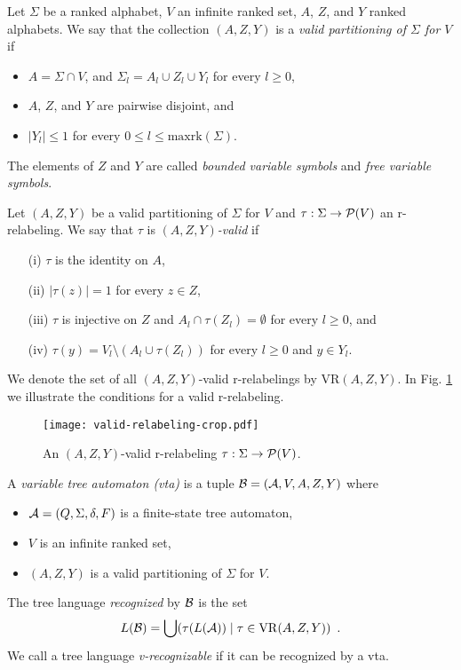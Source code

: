 \documentclass[10pt]{scrartcl}
\newcommand{\maxrk}{{\mathrm{maxrk}}}
\newcommand{\VR}{\mathrm{VR}}
\begin{document}
Let $\Sigma$ be a ranked alphabet, $V$ an infinite ranked set,  $A$, $Z$, and $Y$ 
ranked alphabets. We say that the collection $(A,Z,Y)$ is a {\em valid partitioning
  of $\Sigma$ for $V$} if 
\begin{itemize}
\item $A=\Sigma  \cap V$, and $\Sigma_l = A_l \cup Z_l \cup Y_l$ for every $l\geq 0$, 
\item $A$, $Z$, and $Y$ are pairwise disjoint, and 
\item $|Y_l| \le 1$ for every $0 \le l \le \maxrk(\Sigma)$.
\end{itemize}
The elements of $Z$ and $Y$ are called {\em bounded variable symbols} and {\em
  free variable symbols}. 

Let $(A,Z,Y)$ be a valid partitioning
  of $\Sigma$ for $V$ and $\tau: \Sigma \rightarrow {\cal P}(V)$ an
  r-relabeling. We say that $\tau$ is {\em $(A,Z,Y)$-valid} if 
\begin{enumerate}
\item[(i)] $\tau$ is the identity on $A$,
\item[(ii)] $|\tau(z)| = 1$ for every $z \in Z$,
\item[(iii)] $\tau$ is injective on $Z$ and   $A_l \cap \tau(Z_l) = \emptyset$ for every $l \ge 0$, and 
\item[(iv)] $\tau(y) = V_l \setminus (A_l \cup \tau(Z_l))$ for
  every $l \ge 0$ and $y \in Y_l$.
\end{enumerate}
We denote the set of all $(A,Z,Y)$-valid r-relabelings  
 by $\VR(A,Z,Y)$. In Fig. \ref{fig:valid-rel} we illustrate the conditions for a valid
r-relabeling. 

\begin{figure}
\begin{center}
\texttt{[image: valid-relabeling-crop.pdf]}
\caption{\label{fig:valid-rel} An $(A,Z,Y)$-valid r-relabeling $\tau: \Sigma \rightarrow {\cal P}(V)$.} 
\end{center}
\end{figure}

A {\em variable tree automaton (vta)}  is a tuple ${\cal B} =
({\cal A},V,A,Z,Y)$ where 
\begin{itemize}
\item ${\cal A} = (Q,\Sigma,\delta,F)$ is a finite-state tree automaton,
\item $V$ is an infinite ranked set,
\item $(A,Z,Y)$ is a valid partitioning
  of $\Sigma$ for $V$.
\end{itemize}
The tree language {\em recognized} by ${\cal B}$ is the set 
\[
L({\cal B}) = \bigcup (\tau(L({\cal A})) \mid \tau \in \mathrm{\VR}(A,Z,Y))\enspace.
\]
We call a tree language {\em v-recognizable} if it can be recognized by a vta.
\end{document}
